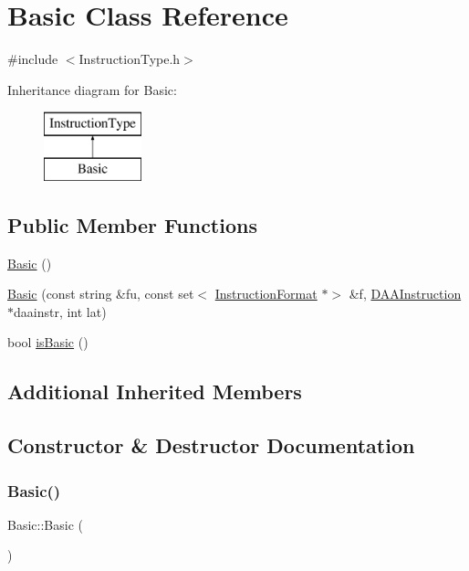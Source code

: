 \hypertarget{classBasic}{}\section{Basic Class Reference}
\label{classBasic}


{\ttfamily \#include $<$Instruction\+Type.\+h$>$}

Inheritance diagram for Basic\+:\begin{figure}[H]
\begin{center}
\leavevmode
\includegraphics[height=2.000000cm]{classBasic}
\end{center}
\end{figure}
\subsection*{Public Member Functions}
\begin{DoxyCompactItemize}
\item 
\hyperlink{classBasic_a0e03bb2ab1cf31e085b421ad9aa38909}{Basic} ()
\item 
\hyperlink{classBasic_a680cf8b7bf4d6707d1a63c24cc13bce6}{Basic} (const string \&fu, const set$<$ \hyperlink{classInstructionFormat}{Instruction\+Format} $\ast$$>$ \&f, \hyperlink{classDAAInstruction}{D\+A\+A\+Instruction} $\ast$daainstr, int lat)
\item 
bool \hyperlink{classBasic_a3ab68a71a2c405d7e14a11a8ce24fd07}{is\+Basic} ()
\end{DoxyCompactItemize}
\subsection*{Additional Inherited Members}


\subsection{Constructor \& Destructor Documentation}
\mbox{\label{classBasic_a0e03bb2ab1cf31e085b421ad9aa38909}} 
\subsubsection{\texorpdfstring{Basic()}{Basic()}\hspace{0.1cm}{\footnotesize\ttfamily [1/2]}}
{\footnotesize\ttfamily Basic\+::\+Basic (\begin{DoxyParamCaption}{ }\end{DoxyParamCaption})}

